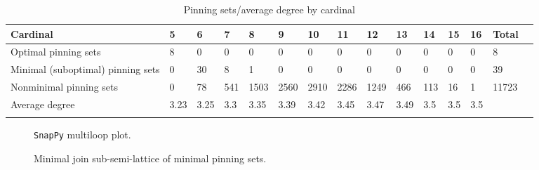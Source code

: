 \documentclass{article}%
\begin{document}
\begin{table}[ht]
	\caption{Pinning sets/average degree by cardinal}
	\centering
	\renewcommand{\arraystretch}{1.5}
	\begin{tabularx}{\textwidth}{lXXXXXXXXXXXXXX}
		\toprule
			Cardinal & 5 & 6 & 7 & 8 & 9 & 10 & 11 & 12 & 13 & 14 & 15 & 16 & Total\\
			\hline
			Optimal pinning sets & 8 & 0 & 0 & 0 & 0 & 0 & 0 & 0 & 0 & 0 & 0 & 0 & 8 \\
			Minimal (suboptimal) pinning sets & 0 & 30 & 8 & 1 & 0 & 0 & 0 & 0 & 0 & 0 & 0 & 0 & 39 \\
			Nonminimal pinning sets & 0 & 78 & 541 & 1503 & 2560 & 2910 & 2286 & 1249 & 466 & 113 & 16 & 1 & 11723 \\
			Average degree & 3.23 & 3.25 & 3.3 & 3.35 & 3.39 & 3.42 & 3.45 & 3.47 & 3.49 & 3.5 & 3.5 & 3.5 &  \\
		\bottomrule \\ 
	\end{tabularx}
\end{table}

\begin{multicols}{2}
\begin{figure}[H]
\centering

\caption{\texttt{SnapPy} multiloop plot.}
\label{fig:tex/img/[[21, 28, 22, 1], [20, 11, 21, 12], [4, 27, 5, 28], [22, 5, 23, 6], [1, 13, 2, 12], [2, 19, 3, 20], [3, 10, 4, 11], [26, 9, 27, 10], [23, 16, 24, 17], [6, 17, 7, 18], [13, 18, 14, 19], [14, 25, 15, 26.svg}
\end{figure}
\columnbreak

\begin{figure}[H]
\centering
\scalebox{0.8}{}
\caption{Minimal join sub-semi-lattice of minimal pinning sets.}
\label{fig:tex/img/[[21, 28, 22, 1], [20, 11, 21, 12], [4, 27, 5, 28], [22, 5, 23, 6], [1, 13, 2, 12], [2, 19, 3, 20], [3, 10, 4, 11], [26, 9, 27, 10], [23, 16, 24, 17], [6, 17, 7, 18], [13, 18, 14, 19], [14, 25, 15, 26.pgf}
\end{figure}
\end{multicols}
\end{document}
